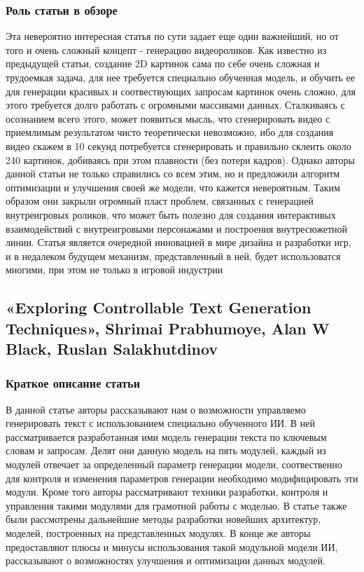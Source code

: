 \documentclass[14pt]{article}
\begin{document}
\subsubsection{Роль статьи в обзоре}
Эта невероятно интересная статья по сути задает еще один важнейший, но от того и очень сложный концепт - генерацию видеороликов. Как известно из предыдущей статьи, создание 2D картинок сама по себе очень сложная и трудоемкая задача, для нее требуется специально обученная модель, и обучить ее для генерации красивых и соотвествующих запросам картинок очень сложно, для этого требуется долго работать с огромными массивами данных. Сталкиваясь с осознанием всего этого, может появиться мысль, что сгенерировать видео с приемлимым результатом чисто теоретически невозможно, ибо для создания видео скажем в 10 секунд потребуется сгенерировать и правильно склеить около 240 картинок, добиваясь при этом плавности (без потери кадров). Однако авторы данной статьи не только справились со всем этим, но и предложили алгоритм оптимизации и улучшения своей же модели, что кажется невероятным. Таким образом они закрыли огромный пласт проблем, связанных с генерацией внутреигровых роликов, что может быть полезно для создания интерактивых взаимодействий с внутреигровыми персонажами и построения внутресюжетной линии. Статья является очередной инновацией в мире дизайна и разработки игр, и в недалеком будущем механизм, представленный в ней, будет использоватся многими, при этом не только в игровой индустрии

\subsection{«Exploring Controllable Text Generation Techniques», Shrimai Prabhumoye, Alan W Black, Ruslan Salakhutdinov}
\subsubsection{Краткое описание статьи}
В данной статье авторы рассказывают нам о возможности управляемо генерировать текст с использованием специально обученного ИИ. В ней рассматривается разработанная ими модель генерации текста по ключевым словам и запросам. Делят они данную модель на пять модулей, каждый из модулей отвечает за определенный параметр генерации модели, соотвественно для контроля и изменения параметров генерации необходимо модифицировать эти модули. Кроме того авторы рассматривают техники разработки, контроля и управления такими модулями для грамотной работы с моделью. В статье также были рассмотрены дальнейшие методы разработки новейших архитектур, моделей, построенных на представленных модулях. В конце же авторы предоставляют плюсы и минусы использования такой модульной модели ИИ, рассказывают о возможностях улучшения и оптимизации данных модулей.
\end{document}
